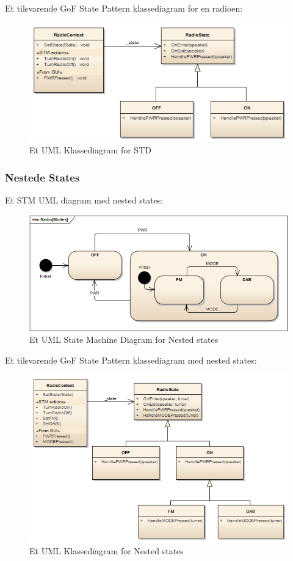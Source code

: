 Et tilsvarende GoF State Pattern klassediagram for en radioen:

\begin{figure}[H]
	\centering
	\includegraphics[width=0.7\linewidth]{figs/state/Radio_StatePattern}
	\caption{Et UML Klassediagram for STD}
	\label{fig:UMLclassState}
\end{figure}

\subsubsection{Nestede States}

Et STM UML diagram med nested states:

\begin{figure}[H]
	\centering
	\includegraphics[width=0.7\linewidth]{figs/state/Radio[Modes]_STM}
	\caption{Et UML State Machine Diagram for Nested states}
	\label{fig:UMLNestedState}
\end{figure}

Et tilsvarende GoF State Pattern klassediagram med nested states:

\begin{figure}[H]
	\centering
	\includegraphics[width=0.7\linewidth]{figs/state/RadioNeted_SP}
	\caption{Et UML Klassediagram for Nested states}
	\label{fig:UMLClassNestedState}
\end{figure}

